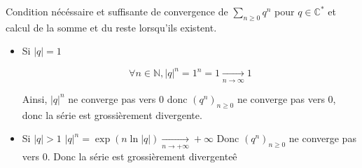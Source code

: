 \documentclass{article}
\begin{document}
\begin{question_kholle}{Condition nécéssaire et suffisante de convergence de $\sum_{n\geqslant 0}q^{n}$ pour $q \in \mathbb{C}^{*}$ et calcul de la somme et du reste lorsqu'ils existent.}
\begin{itemize}[label=$\star$]
        \item Si $\lvert q \rvert=1$
        
        $$\forall n \in \mathbb{N}, \lvert q \rvert ^{n} = 1^{n}=1 \xrightarrow[n \to \infty]{}1$$
        
        Ainsi, $\lvert q \rvert^{n}$ ne converge pas vers 0 donc $(q^{n})_{n\geqslant 0}$ ne converge pas vers 0, donc la série est grossièrement divergente.
        
        \item Si $\lvert q \rvert>1$
        $\lvert q \rvert^{n}=\exp(n \ln \lvert q \rvert) \xrightarrow[n\to +\infty]{} +\infty$
        Donc $(q^{n})_{n\geqslant 0}$ ne converge pas vers $0$. Donc la série est grossièrement divergenteê
    \end{itemize}
\end{question_kholle}
\end{document}
